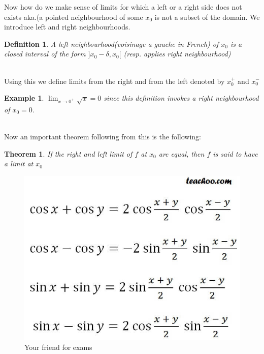 \documentclass[titlepage]{article}
\newtheorem{theorem}{Theorem}[section]
\newtheorem{definition}{Definition}
\numberwithin{equation}{subsection}
\newtheorem{example}{Example}[section]
\begin{document}
Now how do we make sense of limits for which a left or a right side does not exists aka.(a pointed neighbourhood of some $x_{0}$ is not a subset of the domain. We introduce left and right neighbourhoods. 

\begin{definition}
A left neighbourhood(voisinage a gauche in French) of $x_{0}$ is a closed interval of the form $]x_{0} - \delta, x_{0}[$ (resp. applies right neighbourhood)
\end{definition}
\\

Using this we define limits from the right and from the left denoted by $x_{0}^{+}$ and $x_{0}^{-}$
\\

\begin{example}
$\lim_{x\to 0^{+}} \sqrt{x} = 0$ since this definition invokes a right neighbourhood of $x_{0} = 0$. 
\end{example}
\\

Now an important theorem following from this is the following:

\begin{theorem}
If the right and left limit of $f$ at $x_{0}$ are equal, then $f$ is said to \textit{have a limit at $x_{0}$}
\end{theorem}

\begin{figure}[H]
    \centering
    \includegraphics[scale = 0.3]{epflLectureNotes/analysis/figures/formula.jpg}
    \caption{Your friend for exams}
    \label{fig:my_label}
\end{figure}
\end{document}
